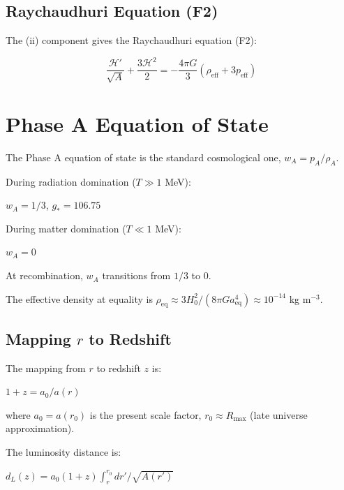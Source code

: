 \documentclass[10pt,twocolumn]{article}
\theoremstyle{definition}
\newcommand{\Rmax}{R_{\max}}
\newcommand{\rhoA}{\rho_{A}}
\newcommand{\Hcal}{\mathcal{H}}
\begin{document}
\subsection{Raychaudhuri Equation (F2)}

The (ii) component gives the Raychaudhuri equation (F2):

\begin{equation}
  \frac{\Hcal'}{\sqrt{A}} + \frac{3 \Hcal^{2}}{2} = - \frac{4 \pi G}{3} (\rho_{\mathrm{eff}} + 3 p_{\mathrm{eff}})
\end{equation}


\section{Phase A Equation of State}
\label{sec:eos}

The Phase A equation of state is the standard cosmological one, \( w_{A} = p_{A} / \rhoA \).

During radiation domination (\( T \gg 1 \) MeV):

\( w_{A} = 1/3 \), \( g_{*} = 106.75 \)

During matter domination (\( T \ll 1 \) MeV):

\( w_{A} = 0 \)

At recombination, \( w_{A} \) transitions from $1/3$ to $0$.

The effective density at equality is \( \rho_{\mathrm{eq}} \approx 3 H_{0}^{2} / (8 \pi G a_{\mathrm{eq}}^{4}) \approx 10^{-14} \) kg m\( ^{-3} \).

\subsection{Mapping \( r \) to Redshift}

The mapping from \( r \) to redshift \( z \) is:

$1 + z = a_{0} / a(r)$

where \( a_{0} = a(r_{0}) \) is the present scale factor, \( r_{0} \approx \Rmax \) (late universe approximation).

The luminosity distance is:

\( d_{L}(z) = a_{0} (1 + z) \int_{r}^{r_{0}} dr' / \sqrt{A(r')} \)

\end{document}
